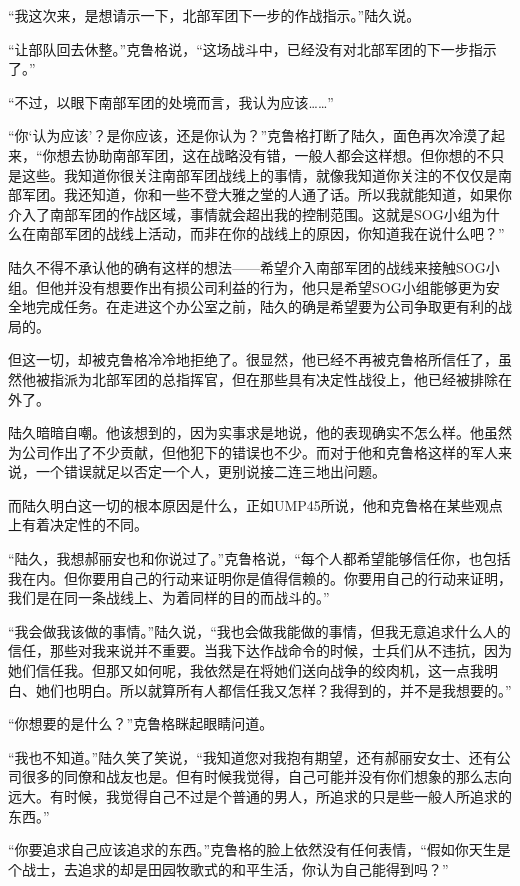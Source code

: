 “我这次来，是想请示一下，北部军团下一步的作战指示。”陆久说。

“让部队回去休整。”克鲁格说，“这场战斗中，已经没有对北部军团的下一步指示了。”

“不过，以眼下南部军团的处境而言，我认为应该……”

“你‘认为应该’？是你应该，还是你认为？”克鲁格打断了陆久，面色再次冷漠了起来，“你想去协助南部军团，这在战略没有错，一般人都会这样想。但你想的不只是这些。我知道你很关注南部军团战线上的事情，就像我知道你关注的不仅仅是南部军团。我还知道，你和一些不登大雅之堂的人通了话。所以我就能知道，如果你介入了南部军团的作战区域，事情就会超出我的控制范围。这就是SOG小组为什么在南部军团的战线上活动，而非在你的战线上的原因，你知道我在说什么吧？”

陆久不得不承认他的确有这样的想法——希望介入南部军团的战线来接触SOG小组。但他并没有想要作出有损公司利益的行为，他只是希望SOG小组能够更为安全地完成任务。在走进这个办公室之前，陆久的确是希望要为公司争取更有利的战局的。

但这一切，却被克鲁格冷冷地拒绝了。很显然，他已经不再被克鲁格所信任了，虽然他被指派为北部军团的总指挥官，但在那些具有决定性战役上，他已经被排除在外了。

陆久暗暗自嘲。他该想到的，因为实事求是地说，他的表现确实不怎么样。他虽然为公司作出了不少贡献，但他犯下的错误也不少。而对于他和克鲁格这样的军人来说，一个错误就足以否定一个人，更别说接二连三地出问题。

而陆久明白这一切的根本原因是什么，正如UMP45所说，他和克鲁格在某些观点上有着决定性的不同。

“陆久，我想郝丽安也和你说过了。”克鲁格说，“每个人都希望能够信任你，也包括我在内。但你要用自己的行动来证明你是值得信赖的。你要用自己的行动来证明，我们是在同一条战线上、为着同样的目的而战斗的。”

“我会做我该做的事情。”陆久说，“我也会做我能做的事情，但我无意追求什么人的信任，那些对我来说并不重要。当我下达作战命令的时候，士兵们从不违抗，因为她们信任我。但那又如何呢，我依然是在将她们送向战争的绞肉机，这一点我明白、她们也明白。所以就算所有人都信任我又怎样？我得到的，并不是我想要的。”

“你想要的是什么？”克鲁格眯起眼睛问道。

“我也不知道。”陆久笑了笑说，“我知道您对我抱有期望，还有郝丽安女士、还有公司很多的同僚和战友也是。但有时候我觉得，自己可能并没有你们想象的那么志向远大。有时候，我觉得自己不过是个普通的男人，所追求的只是些一般人所追求的东西。”

“你要追求自己应该追求的东西。”克鲁格的脸上依然没有任何表情，“假如你天生是个战士，去追求的却是田园牧歌式的和平生活，你认为自己能得到吗？”

